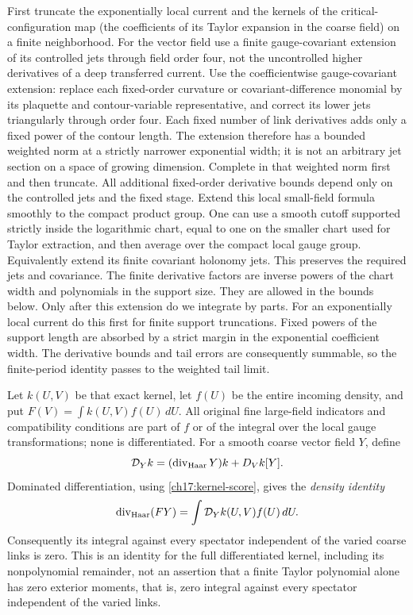 First truncate the exponentially local current and the kernels of the critical-configuration map (the coefficients of its Taylor expansion in the coarse field) on a finite neighborhood. For the vector field use a finite
gauge-covariant extension of its controlled jets through field order four,
not the uncontrolled higher derivatives of a deep transferred current.
Use the coefficientwise gauge-covariant extension: replace each
fixed-order curvature or covariant-difference monomial by its plaquette
and contour-variable representative, and correct its lower jets
triangularly through order four. Each fixed number of link derivatives
adds only a fixed power of the contour length. The extension therefore
has a bounded weighted norm at a strictly narrower exponential width;
it is not an arbitrary jet section on a space of growing dimension.
Complete in that weighted norm first and then truncate. All additional
fixed-order derivative bounds depend only on the controlled jets and
the fixed stage. Extend this local small-field formula smoothly to
the compact product group. One can use a smooth cutoff
supported strictly inside the logarithmic chart, equal to one on the
smaller chart used for Taylor extraction, and then average over the
compact local gauge group. Equivalently extend its finite covariant
holonomy jets. This preserves the required jets and covariance.
The finite derivative factors are inverse powers of the chart width and
polynomials in the support size. They are allowed in the bounds below.
Only after this extension do we integrate by parts. For an exponentially
local current do this first for finite support truncations. Fixed powers
of the support length are absorbed by a strict margin in the
exponential coefficient width. The derivative bounds and tail errors
are consequently summable, so the finite-period identity passes to
the weighted tail limit.

Let $k(U,V)$ be that exact kernel, let $f(U)$ be the entire incoming
density, and put $F(V)=\int k(U,V)f(U)\,dU$. All original fine large-field indicators
and compatibility conditions are part of $f$ or of the integral over the local gauge transformations;
none is differentiated. For a smooth coarse vector field $Y$, define
\[
 \mathcal D_Y k=(\operatorname{div}_{\rm Haar}Y)k+D_Vk[Y].
\]
Dominated differentiation, using \eqref{ch17:kernel-score}, gives the
\emph{density identity}
\begin{equation}\label{ch17:kernel-divergence}
 \operatorname{div}_{\rm Haar}(FY)
       =\int\mathcal D_Y k(U,V)f(U)\,dU.
\end{equation}
Consequently its integral against every spectator independent of the
varied coarse links is zero. This is an identity for the full differentiated kernel,
including its nonpolynomial remainder, not an assertion that a finite
Taylor polynomial alone has zero exterior moments, that is, zero integral against every spectator independent of the varied links.

